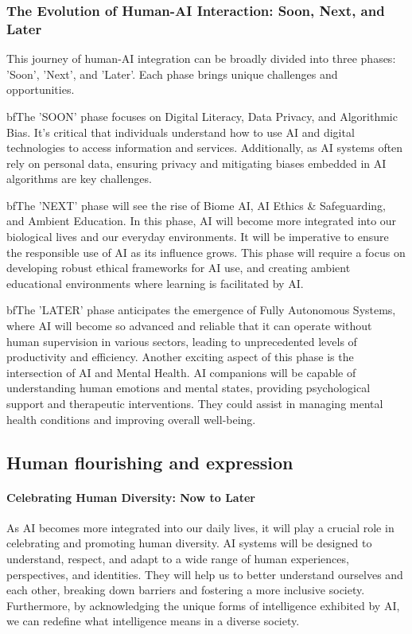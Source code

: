 \subsubsection{The Evolution of Human-AI Interaction: Soon, Next, and Later}
This journey of human-AI integration can be broadly divided into three phases: 'Soon', 'Next', and 'Later'. Each phase brings unique challenges and opportunities.\par 

bf{The 'SOON' phase} focuses on Digital Literacy, Data Privacy, and Algorithmic Bias. It's critical that individuals understand how to use AI and digital technologies to access information and services. Additionally, as AI systems often rely on personal data, ensuring privacy and mitigating biases embedded in AI algorithms are key challenges. \par

bf{The 'NEXT' phase} will see the rise of Biome AI, AI Ethics \& Safeguarding, and Ambient Education. In this phase, AI will become more integrated into our biological lives and our everyday environments. It will be imperative to ensure the responsible use of AI as its influence grows. This phase will require a focus on developing robust ethical frameworks for AI use, and creating ambient educational environments where learning is facilitated by AI.\par 

bf{The 'LATER' phase} anticipates the emergence of Fully Autonomous Systems, where AI will become so advanced and reliable that it can operate without human supervision in various sectors, leading to unprecedented levels of productivity and efficiency. Another exciting aspect of this phase is the intersection of AI and Mental Health. AI companions will be capable of understanding human emotions and mental states, providing psychological support and therapeutic interventions. They could assist in managing mental health conditions and improving overall well-being.

\subsection{Human flourishing and expression}
\paragraph{Celebrating Human Diversity: Now to Later}\par
As AI becomes more integrated into our daily lives, it will play a crucial role in celebrating and promoting human diversity. AI systems will be designed to understand, respect, and adapt to a wide range of human experiences, perspectives, and identities. They will help us to better understand ourselves and each other, breaking down barriers and fostering a more inclusive society. Furthermore, by acknowledging the unique forms of intelligence exhibited by AI, we can redefine what intelligence means in a diverse society.
